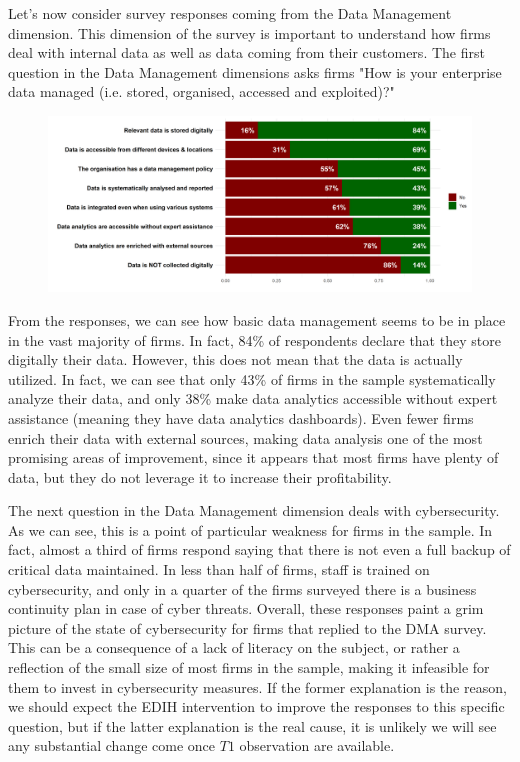 \documentclass[12pt]{report}
\begin{document}
\par Let's now consider survey responses coming from the Data Management dimension. This dimension of the survey is important to understand how firms deal with internal data as well as data coming from their customers. The first question in the Data Management dimensions asks firms "How is your enterprise data managed (i.e. stored, organised, accessed and exploited)?"

\begin{figure}[h!]
    \centering
    \includegraphics[width=\linewidth]{../Output/q7.png}
    \caption{}
    \label{fig:q7_table}
\end{figure}

\par From the responses, we can see how basic data management seems to be in place in the vast majority of firms. In fact, 84\% of respondents declare that they store digitally their data. However, this does not mean that the data is actually utilized. In fact, we can see that only 43\% of firms in the sample systematically analyze their data, and only 38\% make data analytics accessible without expert assistance (meaning they have data analytics dashboards). Even fewer firms enrich their data with external sources, making data analysis one of the most promising areas of improvement, since it appears that most firms have plenty of data, but they do not leverage it to increase their profitability. 

\par The next question in the Data Management dimension deals with cybersecurity. As we can see, this is a point of particular weakness for firms in the sample. In fact, almost a third of firms respond saying that there is not even a full backup of critical data maintained. In less than half of firms, staff is trained on cybersecurity, and only in a quarter of the firms surveyed there is a business continuity plan in case of cyber threats. Overall, these responses paint a grim picture of the state of cybersecurity for firms that replied to the DMA survey. This can be a consequence of a lack of literacy on the subject, or rather a reflection of the small size of most firms in the sample, making it infeasible for them to invest in cybersecurity measures. If the former explanation is the reason, we should expect the EDIH intervention to improve the responses to this specific question, but if the latter explanation is the real cause, it is unlikely we will see any substantial change come once $T1$ observation are available.
\end{document}
